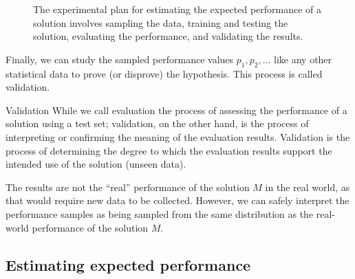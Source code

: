 \begin{figure}
  \caption{
  The experimental plan for estimating the expected performance of a solution involves
  sampling the data, training and testing the solution, evaluating the performance, and
  validating the results.
  }
  \label{fig:plan-single}
\end{figure}

Finally, we can study the sampled performance values $p_1, p_2, \ldots$ like any other
statistical data to prove (or disprove) the hypothesis.  This process is called
validation.

\begin{definition}{Validation}\label{def:validation}
  While we call evaluation the process of assessing the performance of a solution using a
  test set; validation, on the other hand, is the process of interpreting or confirming
  the meaning of the evaluation results.  Validation is the process of determining the
  degree to which the evaluation results support the intended use of the solution (unseen
  data).
\end{definition}

The results are not the ``real'' performance of the solution
$M$ in the real world, as that would require new data to be collected.  However, we can
safely interpret the performance samples as being sampled from the same distribution as
the real-world performance of the solution $M$.


\subsection{Estimating expected performance}
\label{sub:expected-performance}

